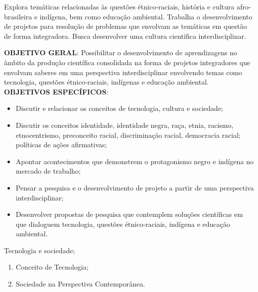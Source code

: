 \begin{pud}

	
	
	\ementa 
	Explora temáticas relacionadas às questões étnico-raciais, história e
	cultura afro-brasileira e indígena, bem como educação ambiental. Trabalha o
	desenvolvimento de projetos para resolução de problemas que envolvam
	as temáticas em questão de forma integradora. Busca desenvolver uma cultura
	científica interdisciplinar.
	
	\objetivos
	\textbf{OBJETIVO GERAL}:
	Possibilitar o desenvolvimento de aprendizagens no âmbito da produção científica consolidada na forma de projetos integradores que envolvam saberes em uma perspectiva interdisciplinar envolvendo temas como tecnologia, questões étnico-raciais, indígenas e educação ambiental.	
	\newline\\	
	\textbf{OBJETIVOS ESPECÍFICOS}:
	\begin{itemize}
		\item Discutir e relacionar os conceitos de tecnologia, cultura e sociedade;
        \item Discutir os conceitos identidade, identidade negra, raça, etnia, racismo, etnocentrismo, preconceito racial, discriminação racial, democracia racial; políticas de ações afirmativas; 
        \item Apontar acontecimentos que demonstrem o protagonismo negro e indígena no mercado de trabalho;
        \item Pensar a pesquisa e o desenvolvimento de projeto a partir de uma perspectiva interdisciplinar;
        \item Desenvolver propostas de pesquisa que contemplem soluções científicas em que dialoguem tecnologia, questões étnico-raciais, indígena e educação ambiental.
	\end{itemize}
	
	
	\programa
	\begin{description}[itemsep=0em]
		\item[UNIDADE I:] Tecnologia e sociedade;	 
	         \begin{enumerate}[itemsep=0em, topsep=0em]
				\item Conceito de Tecnologia;
				\item Sociedade na Perspectiva Contemporânea.
            \end{enumerate}
            

\end{description}
\end{pud}
